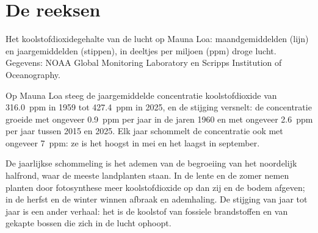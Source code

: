 \section{De reeksen}

\begin{omfigure}

{\small Het koolstofdioxidegehalte van de lucht op Mauna Loa: maandgemiddelden
(lijn) en jaargemiddelden (stippen), in deeltjes per miljoen (ppm) droge lucht.
Gegevens: NOAA Global Monitoring Laboratory en Scripps Institution of
Oceanography.}
\end{omfigure}

\begin{proposition}[De koolstofdioxidereeks]\label{prop:g12:climate-change:co2}
Op Mauna Loa steeg de jaargemiddelde concentratie koolstofdioxide van
\qty{316.0}{ppm} in 1959 tot \qty{427.4}{ppm} in 2025, en de stijging
versnelt: de concentratie groeide met ongeveer \qty{0.9}{ppm} per jaar in
de jaren 1960 en met ongeveer \qty{2.6}{ppm} per jaar tussen 2015 en 2025. Elk
jaar schommelt de concentratie ook met ongeveer \qty{7}{ppm}: ze is het hoogst in
mei en het laagst in september.
\end{proposition}

\begin{remark}\label{rem:g12:climate-change:teeth}
De jaarlijkse schommeling is het ademen van de begroeiing van het noordelijk
halfrond, waar de meeste landplanten staan. In de lente en de zomer nemen planten
door fotosynthese meer koolstofdioxide op dan zij en de bodem afgeven;
in de herfst en de winter winnen afbraak en ademhaling. De stijging van jaar tot
jaar is een ander verhaal: het is de koolstof van fossiele brandstoffen en van gekapte
bossen die zich in de lucht ophoopt.
\end{remark}

